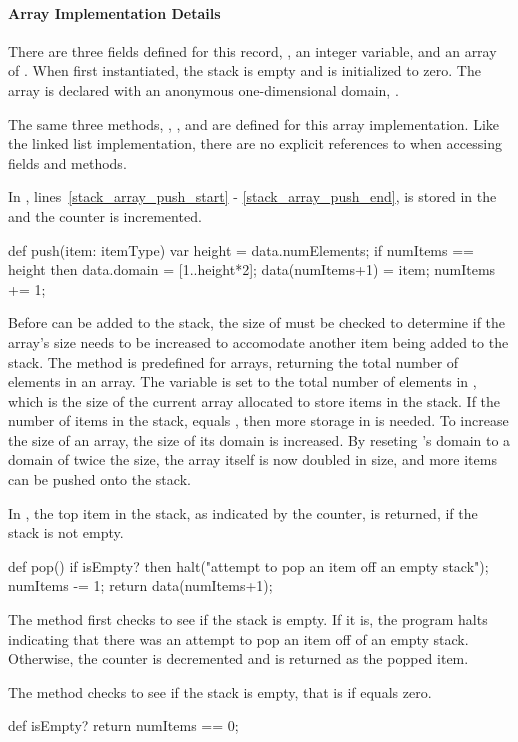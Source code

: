 \paragraph{Array Implementation Details}
There are three fields defined for this  record, ,
an integer variable,  and an array  of .
When first instantiated,
the stack is empty and  is initialized to zero.   The 
array is declared with an anonymous one-dimensional domain, \chpl{[1..2]}.

The same three methods, , , and  are
defined for this array implementation.  Like the linked list implementation,
there are no explicit references to  when accessing fields and
methods.

In , lines~\ref{stack_array_push_start}
- \ref{stack_array_push_end},  is stored in the 
and the  counter is incremented.  
\begin{chapel}
  def push(item: itemType) {       
    var height = data.numElements;  
    if numItems == height then     
      data.domain = [1..height*2];
    data(numItems+1) = item;        
    numItems += 1;                 
  }                               
\end{chapel}
Before  can be added
to the stack, the size of  must be checked to determine if the array's size
needs to be increased to accomodate another item being added to the stack.
The method  is predefined for arrays, returning the total
number of elements in an array.  The variable  is set to the
total number of elements in , which is the size of the current array
allocated to store items in the stack.
If the number of items in the stack,  equals
, then more storage in  is needed.  To increase the
size of an array, the size of its domain is increased.
By reseting 's
domain to a domain of twice the size, the array  itself is now doubled in size,
and more items can be pushed onto the stack. 

In , the top item in the stack, as indicated by the  counter,
is returned, if the stack is not empty.
\begin{chapel}
  def pop() {                       
    if isEmpty? then                
      halt("attempt to pop an item off an empty stack"); 
    numItems -= 1;                  
    return data(numItems+1);       
  }
\end{chapel}
The  method first checks to see if the stack is empty.  If it is, the program
halts indicating that there was an attempt to pop an item off of an empty stack.
Otherwise, the  counter is decremented and 
is returned as the popped item.  

The  method checks to see if
the stack is empty, that is if  equals zero.
\begin{chapel}
  def isEmpty? return numItems == 0; 
\end{chapel}

